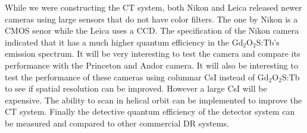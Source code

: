 While we were constructing the CT system, both Nikon and Leica released newer cameras using large sensors that do not have color filters.  The one by Nikon is a CMOS senor while the Leica uses a CCD.  The specification of the Nikon camera indicated that it has a much higher quantum efficiency in the $\mathrm{Gd_2O_2S}$:Tb's emission spectrum.  It will be very interesting to test the camera and compare its performance with the Princeton and Andor camera.  It will also be interesting to test the performance of these cameras using columnar CsI instead of $\mathrm{Gd_2O_2S}$:Tb to see if spatial resolution can be improved.  However a large CsI will be expensive.  The ability to scan in helical orbit can be implemented to improve the CT system.  Finally the detective quantum efficiency of the detector system can be measured and compared to other commercial DR systems.

